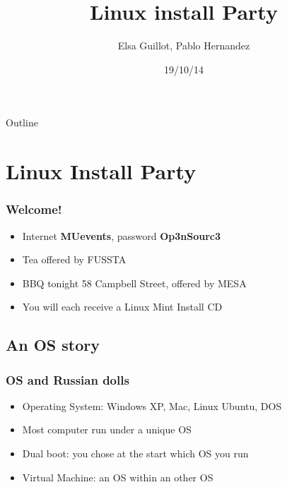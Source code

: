 \documentclass{beamer}
\title[Open Source Workshop (beamer)]{Linux install Party}
\author[Elsa, Pablo]{Elsa Guillot, Pablo Hernandez}
\institute[IFS]{IFS, Massey University}
\date{19/10/14}
\begin{document}
\begin{frame}
  \titlepage
\end{frame}

\begin{frame}{Outline}
  \tableofcontents
\end{frame}

\section{Linux Install Party}
\begin{frame}
\frametitle{Welcome!}
\begin{itemize}
\item Internet \textbf{MUevents}, password \textbf{Op3nSourc3}
\item Tea offered by FUSSTA
\item BBQ tonight 58 Campbell Street, offered by MESA
\item You will each receive a Linux Mint Install CD
\end{itemize}
\end{frame}

\subsection{An OS story}
\begin{frame}
\frametitle{OS and Russian dolls}
\begin{itemize}
  \item Operating System: Windows XP, Mac, Linux Ubuntu, DOS
  \item Most computer run under a unique OS
  \item Dual boot: you chose at the start which OS you run
  \item Virtual Machine: an OS within an other OS
\end{itemize}
\end{frame}
\end{document}
